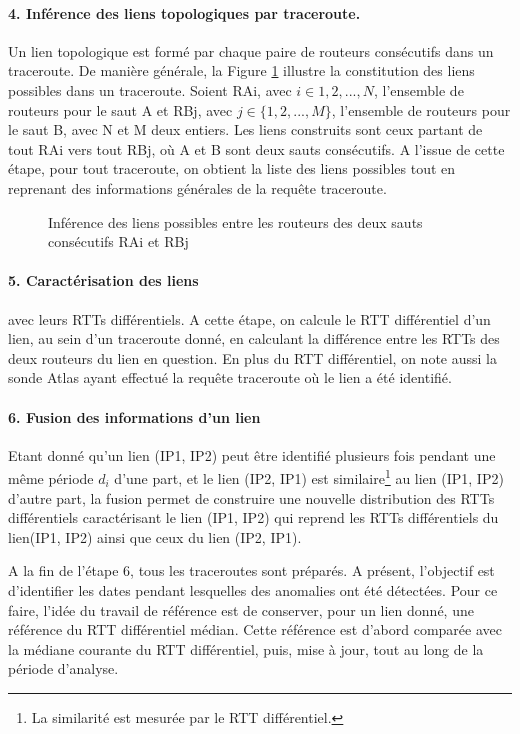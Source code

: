\paragraph{4. Inférence des liens topologiques par traceroute.} Un lien topologique est formé par chaque paire de routeurs consécutifs dans un traceroute. De manière générale, la Figure \ref{fig:link-inference} illustre la constitution des liens possibles  dans un traceroute. Soient  RAi, avec $i \in {1,2, ...,N}$,  l'ensemble de routeurs pour le saut A et RBj, avec $j \in \{1,2, ..., M\}$, l'ensemble  de routeurs pour le saut B, avec N et M deux entiers. Les liens  construits sont ceux partant de tout RAi vers tout RBj, où A et B sont deux sauts consécutifs. A l'issue de cette étape, pour tout traceroute, on obtient la liste des liens possibles tout en reprenant des informations générales de la requête traceroute.
\begin{figure}[H]
	\centering
	\captionsetup{justification=centering}
	
	\caption{Inférence des liens possibles entre les routeurs des deux sauts consécutifs RAi et RBj}
	\label{fig:link-inference}
\end{figure}
\paragraph{5. Caractérisation des liens} avec leurs RTTs différentiels. A cette étape, on calcule le RTT différentiel d'un lien, au sein d'un traceroute donné, en calculant la différence entre les RTTs des deux routeurs du lien en question. En plus du RTT différentiel, on note aussi la sonde Atlas ayant effectué la requête traceroute où le lien a été identifié. 

\paragraph{6. Fusion des informations d'un lien} Etant donné qu'un lien (IP1, IP2) peut être identifié plusieurs fois pendant une même période $d_i$ d'une part, et le lien (IP2, IP1) est similaire\footnote{La similarité est mesurée par le RTT différentiel.} au lien  (IP1, IP2) d'autre part, la fusion permet de construire une nouvelle distribution des RTTs différentiels caractérisant le lien (IP1, IP2) qui reprend les RTTs différentiels du lien(IP1, IP2) ainsi que ceux du lien (IP2, IP1).


A la fin de l'étape 6, tous les traceroutes sont préparés. A présent, l'objectif est d'identifier les dates pendant lesquelles des anomalies ont été détectées. Pour ce faire, l'idée du travail de référence est de conserver, pour un lien donné, une référence du RTT différentiel médian.  Cette référence est d'abord comparée avec la médiane courante du RTT différentiel,  puis,  mise à jour,   tout au long de la période d'analyse.

